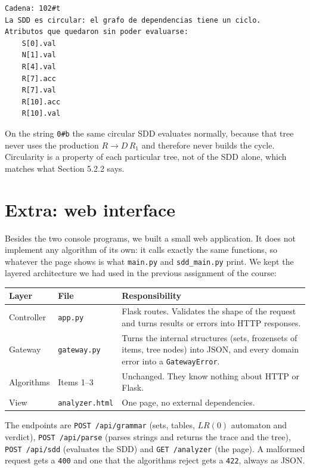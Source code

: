 \documentclass[11pt]{article}
\begin{document}
\begin{center}
\small
\begin{verbatim}
Cadena: 102#t
La SDD es circular: el grafo de dependencias tiene un ciclo.
Atributos que quedaron sin poder evaluarse:
    S[0].val
    N[1].val
    R[4].val
    R[7].acc
    R[7].val
    R[10].acc
    R[10].val
\end{verbatim}
\end{center}

On the string \texttt{0\#b} the same circular SDD evaluates normally, because that tree
never uses the production $R \rightarrow D\,R_1$ and therefore never builds the cycle.
Circularity is a property of each particular tree, not of the SDD alone, which matches
what Section 5.2.2 says.

\section{Extra: web interface}

Besides the two console programs, we built a small web application. It does not
implement any algorithm of its own: it calls exactly the same functions, so whatever the
page shows is what \texttt{main.py} and \texttt{sdd\_main.py} print. We kept the layered
architecture we had used in the previous assignment of the course:

\begin{center}
\small
\begin{tabular}{@{}llp{6.6cm}@{}}
\toprule
\textbf{Layer} & \textbf{File} & \textbf{Responsibility} \\
\midrule
\addlinespace
Controller & \texttt{app.py} & Flask routes. Validates the shape of the request and turns results or errors into HTTP responses. \\
\addlinespace
Gateway & \texttt{gateway.py} & Turns the internal structures (sets, frozensets of items, tree nodes) into JSON, and every domain error into a \texttt{GatewayError}. \\
\addlinespace
Algorithms & Items 1--3 & Unchanged. They know nothing about HTTP or Flask. \\
\addlinespace
View & \texttt{analyzer.html} & One page, no external dependencies. \\
\bottomrule
\end{tabular}
\end{center}

The endpoints are \texttt{POST /api/grammar} (sets, tables, $LR(0)$ automaton and
verdict), \texttt{POST /api/parse} (parses strings and returns the trace and the tree),
\texttt{POST /api/sdd} (evaluates the SDD) and \texttt{GET /analyzer} (the page). A
malformed request gets a \texttt{400} and one that the algorithms reject gets a
\texttt{422}, always as JSON.
\end{document}
